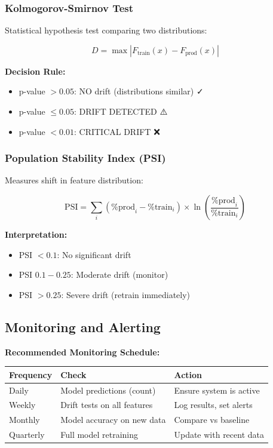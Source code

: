 \documentclass[11pt,a4paper]{article}
\begin{document}
\subsubsection{Kolmogorov-Smirnov Test}

Statistical hypothesis test comparing two distributions:

\[
D = \max |F_{\text{train}}(x) - F_{\text{prod}}(x)|
\]

\textbf{Decision Rule:}
\begin{itemize}
    \item p-value $> 0.05$: NO drift (distributions similar) ✓
    \item p-value $\leq 0.05$: DRIFT DETECTED ⚠️
    \item p-value $< 0.01$: CRITICAL DRIFT ❌
\end{itemize}

\subsubsection{Population Stability Index (PSI)}

Measures shift in feature distribution:

\[
\text{PSI} = \sum_{i} \left( \% \text{prod}_i - \% \text{train}_i \right) \times \ln\left(\frac{\% \text{prod}_i}{\% \text{train}_i}\right)
\]

\textbf{Interpretation:}
\begin{itemize}
    \item PSI $< 0.1$: No significant drift
    \item PSI $0.1-0.25$: Moderate drift (monitor)
    \item PSI $> 0.25$: Severe drift (retrain immediately)
\end{itemize}

\subsection{Monitoring and Alerting}

\textbf{Recommended Monitoring Schedule:}

\begin{table}[H]
\centering
\begin{tabular}{|l|l|l|}
\toprule
\textbf{Frequency} & \textbf{Check} & \textbf{Action} \\
\midrule
Daily & Model predictions (count) & Ensure system is active \\
Weekly & Drift tests on all features & Log results, set alerts \\
Monthly & Model accuracy on new data & Compare vs baseline \\
Quarterly & Full model retraining & Update with recent data \\
\bottomrule
\end{tabular}
\end{table}
\end{document}
